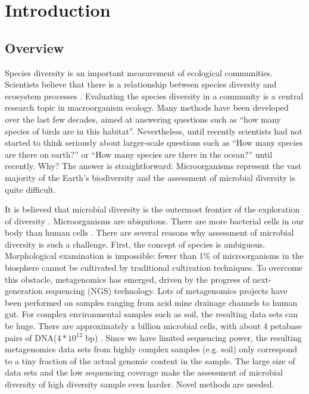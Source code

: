 \chapter{Introduction}

\section{Overview} Species diversity is an important measurement of ecological
communities. Scientists believe that there is a relationship between species
diversity and ecosystem processes \cite{Loreau:2001aa}. Evaluating the species
diversity in a community is a central research topic in macroorganism ecology.
Many methods have been developed over the last few decades, aimed at answering
questions such as ``how many species of birds are in this habitat''.
Nevertheless, until recently scientists had not started to think seriously
about larger-scale questions such as ``How many species are there on earth?''
\cite{May:1988aa} or ``How many species are there in the ocean?''
\cite{Mora:2011aa} until recently. Why? The answer is straightforward:
Microorganisms represent the vast majority of the Earth's biodiversity and the
assessment of microbial diversity is quite difficult.

It is believed that microbial diversity is the outermost frontier of the
exploration of diversity \cite{magurran2011biological}. Microorganisms are
ubiquitous. There are more
bacterial cells in our body than human cells \cite{Savage:1977aa}. 
There are several reasons why assessment of microbial diversity is such a
challenge. First, the concept of species is ambiguous. Morphological
examination is impossible: fewer than 1\% of microorganisms  in the biosphere
cannot be cultivated by traditional cultivation
techniques\cite{Curtis:2002aa}. To overcome this obstacle, metagenomics has
emerged, driven by the progress of next-generation sequencing (NGS) technology.
Lots of metagenomics projects have been performed on samples ranging from acid
mine drainage channels to human gut. For complex environmental samples such as
soil, the resulting data sets can be huge. There are approximately a billion
microbial cells, with about 4 petabase pairs of DNA($4*{10}^{12}$ bp)
\cite{Zarraonaindia:2013aa}. Since we have limited sequencing power, the
resulting metagenomics data sets from highly complex samples (e.g. soil) only
correspond to a tiny fraction of the actual genomic content in the sample. The
large size of data sets and the low sequencing coverage make the assessment of
microbial diversity of high diversity sample even harder. Novel methods are
needed.



